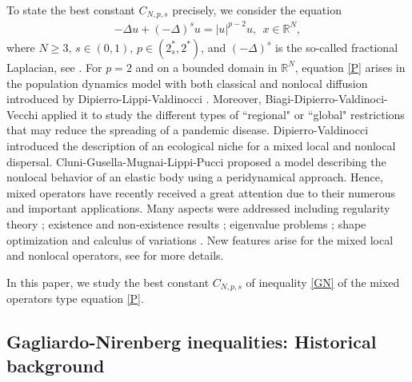 \documentclass[12pt,a4paper,reqno]{amsart}
\numberwithin{equation}{section}
\begin{document}
To state the best constant $C_{N,p,s}$ precisely, we consider the equation
\begin{equation}\label{P}
\begin{aligned}
-\Delta u
+(-\Delta)^{s}u =|u|^{p-2}u, \ \ x\in\mathbb{R}^{N},
\end{aligned}
\tag{$P$}
\end{equation}
where $N\geqslant3$, $s\in(0,1)$, $p\in (2^{*}_{s},2^{*})$,
and $(-\Delta)^{s}$ is the so-called fractional
Laplacian, see \cite{Caffarelli-Silvestre2007PDE}.
For $p=2$ and on a bounded domain in $\mathbb{R}^{N}$,
equation \eqref{P} arises in the population dynamics model with both classical and nonlocal diffusion introduced by
Dipierro-Lippi-Valdinocci \cite{Dipierro-Lippi-Valdinocci2022AIHP}.
Moreover, Biagi-Dipierro-Valdinoci-Vecchi \cite{Biagi-Dipierro-Valdinoci-Vecchi2021CPDE} applied it to study the different types of ``regional" or ``global" restrictions that may reduce the spreading of a pandemic disease.
Dipierro-Valdinocci \cite{Dipierro-Valdinocci2021PA} introduced the description of an ecological niche for a mixed local and nonlocal dispersal.
Cluni-Gusella-Mugnai-Lippi-Pucci
\cite{Cluni-Gusella-Mugnai-ProiettiLippi-Pucci2023ME}
proposed a model describing the nonlocal behavior of an elastic
body using a peridynamical approach.
Hence, mixed operators have recently received a great attention due to their numerous and important applications. Many aspects were addressed including regularity theory
\cite{Biagi-Dipierro-Valdinoci-Vecchi2021CPDE,Su-Valdinoci-Wei-Zhang2022MZ,DeFilippis-Mingione2024MA,Byun-Kumar-Lee2024CVPDE};
existence and non-existence
results
\cite{Biagi-Mugnai-Vecchi2022CCM,Chergui-Gou-Hajaiej2023CVPDE,Salort-Vecchi2022DIE,LuoTJ-Hajaiej2022ANS,Maione-Mugnai-Vecchi2023FCAA};
eigenvalue problems \cite{Dipierro-Proietti Lippi-Valdinoci2022AA,Del Pezzo-Ferreira-Rossi2019FCAA,ChenHY-Bhakta-Hajaiej2022JDE};
shape optimization and calculus of
variations \cite{Biagi-Dipierro-Valdinoci-Vecchi2023JAM}. New features arise for the mixed local and nonlocal operators, see \cite{Su-Hajaiej-Shi2026, Su-Hajaiej2026} for more details.


In this paper, we study the best constant $C_{N,p,s}$ of inequality \eqref{GN} of the mixed operators type equation \eqref{P}.


\subsection{Gagliardo-Nirenberg inequalities: Historical background}
\end{document}
